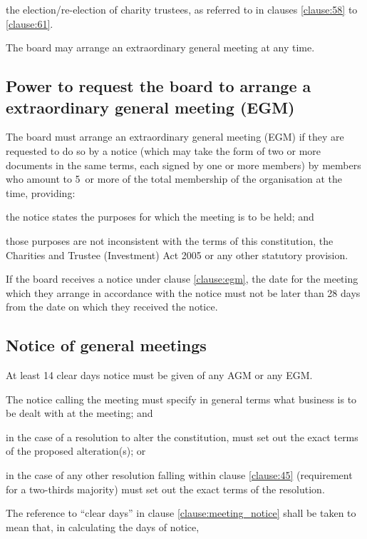 \documentclass{article}
\begin{document}
\subclause the election/re-election of charity trustees, as referred
to in clauses \ref{clause:58} to \ref{clause:61}.

\clause The board may arrange an extraordinary general meeting at any time.

\subsection{Power to request the board to arrange a extraordinary
  general meeting (EGM)}

\clause\label{clause:egm}The board must arrange an extraordinary
general meeting (EGM) if they are requested to do so by a notice
(which may take the form of two or more documents in the same terms,
each signed by one or more members) by members who amount to
5\percent\ or more of the total membership of the organisation at the
time, providing:

\subclause the notice states the purposes for which the meeting is to
be held; and

\subclause those purposes are not inconsistent with the terms of this
constitution, the Charities and Trustee (Investment) Act 2005 or any
other statutory provision.

\clause If the board receives a notice under clause \ref{clause:egm},
the date for the meeting which they arrange in accordance with the
notice must not be later than 28 days from the date on which they
received the notice.

\subsection{Notice of general meetings}

\clause\label{clause:meeting_notice}At least 14 clear days notice must
be given of any AGM or any EGM.

\clause The notice calling the meeting must specify in general terms
what business is to be dealt with at the meeting; and 

\subclause in the case of a resolution to alter the constitution, must
set out the exact terms of the proposed alteration(s); or

\subclause in the case of any other resolution falling within clause
\ref{clause:45} (requirement for a two-thirds majority) must set out
the exact terms of the resolution.

\clause The reference to ``clear days'' in clause
\ref{clause:meeting_notice} shall be taken to mean that, in
calculating the days of notice, 
\end{document}

